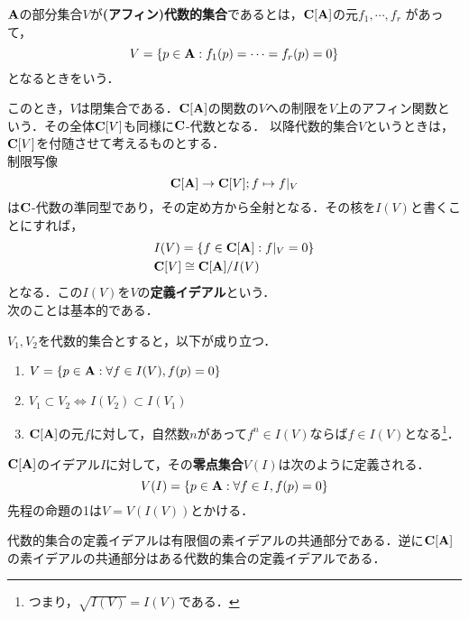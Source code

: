 \documentclass{myclass}
\begin{document}
\begin{definition}
  $\mathbf{A}$の部分集合$V$が\textbf{(アフィン)代数的集合}であるとは，$\mathbf{C}[\mathbf{A}]$の元$f_1,\cdots,f_r$
  があって，
  \begin{equation*}
    V = \{p \in \mathbf{A} : f_1(p) = \cdots = f_r(p) = 0\}
  \end{equation*}
  となるときをいう．
\end{definition}
このとき，$V$は閉集合である．$\mathbf{C}[\mathbf{A}]$の関数の$V$への制限を$V$上のアフィン関数という．その全体$\mathbf{C}[V]$も同様に$\mathbf{C}$-代数となる．
以降代数的集合$V$というときは，$\mathbf{C}[V]$を付随させて考えるものとする．\\
制限写像
\begin{equation*}
  \mathbf{C}[\mathbf{A}] \to \mathbf{C}[V];f\mapsto f|_V
\end{equation*}
は$\mathbf{C}$-代数の準同型であり，その定め方から全射となる．その核を$I(V)$と書くことにすれば，
\begin{align*}
  &I(V) = \{f\in \mathbf{C}[\mathbf{A}] : f|_V = 0\}\\
  &\mathbf{C}[V] \cong \mathbf{C}[\mathbf{A}]/I(V)
\end{align*}
となる．この$I(V)$を$V$の\textbf{定義イデアル}という．\\
次のことは基本的である．

\begin{proposition}
  $V_1,V_2$を代数的集合とすると，以下が成り立つ．
  \begin{enumerate}
    \item $V = \{p \in \mathbf{A} : \forall f \in I(V),f(p) = 0\}$
    \item $V_1\subset V_2 \Leftrightarrow I(V_2)\subset I(V_1)$
    \item $\mathbf{C}[\mathbf{A}]$の元$f$に対して，自然数$n$があって$f^n\in I(V)$ならば$f \in I(V)$となる\footnote{つまり，$\sqrt{I(V)} = I(V)$である．}．
  \end{enumerate}
\end{proposition}

\begin{definition}
  $\mathbf{C}[\mathbf{A}]$のイデアル$I$に対して，その\textbf{零点集合}$V(I)$は次のように定義される．
  \begin{equation*}
    V(I) = \{p\in \mathbf{A} : \forall f \in I, f(p) = 0\}
  \end{equation*}
  先程の命題の1は$V=V(I(V))$とかける．
\end{definition}

\begin{proposition}\label{prop:1.2.5}
  代数的集合の定義イデアルは有限個の素イデアルの共通部分である．逆に$\mathbf{C}[\mathbf{A}]$の素イデアルの共通部分はある代数的集合の定義イデアルである．
\end{proposition}
\end{document}
